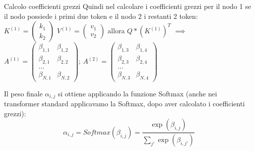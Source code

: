 \begin{example}{Calcolo coefficienti grezzi}
    Quindi nel calcolare i coefficienti grezzi per il nodo 1 se il nodo possiede i primi due token e il nodo 2 i restanti 2 token: \\
    $K^{(1)} = 
    \begin{pmatrix}
        k_1 \\
        k_2
    \end{pmatrix}$
    $V^{(1)} = 
    \begin{pmatrix}
        v_1 \\
        v_2
    \end{pmatrix}$
    allora
    $Q * (K^{(1)})^T$ $\implies$
    $A^{(1)} = 
    \begin{pmatrix}
        \beta_{1,1} & \beta_{1,2} \\
        \beta_{2,1} & \beta_{2,2} \\
        \dots \\
        \beta_{N,1} & \beta_{N,2} 
    \end{pmatrix}$;
    $A^{(2)} = 
    \begin{pmatrix}
        \beta_{1,3} & \beta_{1,4} \\
        \beta_{2,3} & \beta_{2,4} \\
        \dots \\
        \beta_{N,3} & \beta_{N,4} 
    \end{pmatrix}$
\end{example}



Il peso finale $\alpha_{i,j}$ si ottiene applicando la funzione Softmax (anche nei transformer standard applicavamo la Softmax, dopo aver calcolato i coefficienti grezzi):
\begin{equation}
\alpha_{i,j} = Softmax(\beta_{i,j}) = \frac{\exp(\beta_{i,j})}{\sum_{j'} \exp(\beta_{i,j'})}
\end{equation}

